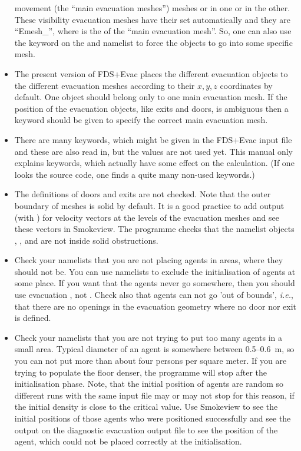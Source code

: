 \documentclass[12pt,a4paper,final,twoside]{stylevk}
\begin{document}
\begin{itemize}
  movement (the ``main evacuation meshes'') meshes or in one or in the
  other.  These visibility evacuation meshes have their  set
  automatically and they are ``Emesh\_'', where  is
  the  of the ``main evacuation mesh''.  So, one can also
  use the keyword  on the  and
   namelist to force the objects to go into some specific
  mesh.
%
\item The present version of FDS+Evac places the different evacuation
  objects to the different evacuation meshes according to their
  $x,y,z$ coordinates by default.  One object should belong only to
  one main evacuation mesh.  If the position of the evacuation
  objects, like exits and doors, is ambiguous then a keyword
   should be given to specify the correct main
  evacuation mesh.
%
\item There are many keywords, which might be given in the FDS+Evac
  input file and these are also read in, but the values are not used
  yet.  This manual only explains keywords, which actually have some
  effect on the calculation.  (If one looks the 
  source code, one finds a quite many non-used keywords.)
%
\item The definitions of doors and exits are not checked.  Note that
  the outer boundary of meshes is solid by default.  It is a good
  practice to add  output (with )
  for velocity vectors at the levels of the evacuation meshes and see
  these vectors in Smokeview.  The programme checks that the namelist
  objects , , and  are not inside
  solid obstructions.
%
\item Check your  namelists that you are not placing
  agents in areas, where they should not be.  You can use 
  namelists to exclude the initialisation of agents at some place.  If
  you want that the agents never go somewhere, then you should use
  evacuation , not .  Check also that agents
  can not go 'out of bounds', \emph{i.e.}, that there are no openings
  in the evacuation geometry where no door nor exit is defined.
%
\item Check your  namelists that you are not trying to put
  too many agents in a small area.  Typical diameter of an agent
  is somewhere between 0.5--0.6~m, so you can not put more than about
  four persons per square meter.  If you are trying to populate the
  floor denser, the programme will stop after the initialisation
  phase.  Note, that the initial position of agents are random so
  different runs with the same input file may or may not stop for this
  reason, if the initial density is close to the critical value.  Use
  Smokeview to see the initial positions of those agents who were
  positioned successfully and see the output on the diagnostic
  evacuation output file  to see the position of
  the agent, which could not be placed correctly at the
  initialisation.
%
\end{itemize}
\end{document}
